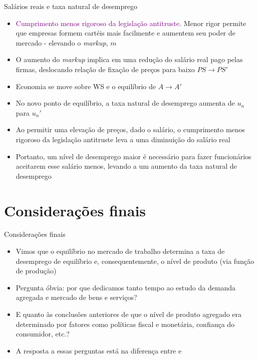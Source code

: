 \documentclass[10pt]{beamer}
\begin{document}
\begin{frame}
    {Salários reais e taxa natural de desemprego}
    \begin{itemize}
        \item \textcolor{purple}{Cumprimento menos rigoroso da legislação antitruste}. Menor rigor permite que empresas formem cartéis mais facilmente e aumentem seu poder de mercado - elevando o \emph{markup}, $m$\bigskip
        \item O aumento do \emph{markup} implica em uma redução do salário real pago pelas firmas, deslocando relação de fixação de preços para baixo $PS \to PS'$\bigskip
        \item Economia se move sobre WS e o equilíbrio de $A \to A'$\bigskip
        \item No novo ponto de equilíbrio, a taxa natural de desemprego aumenta de $u_n$ para $u_n'$\bigskip
        \item Ao permitir uma elevação de preços, dado o salário, o cumprimento menos rigoroso da legislação antitruste leva a uma diminuição do salário real\bigskip
        \item Portanto, um nível de desemprego maior é necessário para fazer funcionários aceitarem esse salário menos, levando a um aumento da taxa natural de desemprego
    \end{itemize}
\end{frame}

\section{Considerações finais}
\begin{frame}
    {Considerações finais}
    \begin{itemize}
        \item Vimos que o equilíbrio no mercado de trabalho determina a taxa de desemprego de equilíbrio e, consequentemente, o nível de produto (via função de produção)\bigskip
        \item Pergunta óbvia: por que dedicamos tanto tempo ao estudo da demanda agregada e mercado de bens e serviços?\bigskip
        \item E quanto às conclusões anteriores de que o nível de produto agregado era determinado por fatores como políticas fiscal e monetária, confiança do consumidor, etc.?\bigskip
        \item A resposta a essas perguntas está na diferença entre  e 
    \end{itemize}
\end{frame}
\end{document}
